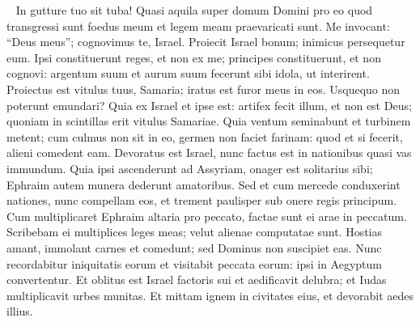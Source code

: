 \begin{biblechapter}   
\verse In gutture tuo sit tuba! Quasi aquila super domum Domini pro eo quod transgressi sunt foedus meum et legem meam praevaricati sunt. 
\verse Me invocant: “Deus meus”; cognovimus te, Israel. 
\verse Proiecit Israel bonum; inimicus persequetur eum. 
\verse Ipsi constituerunt reges, et non ex me; principes constituerunt, et non cognovi: argentum suum et aurum suum fecerunt sibi idola, ut interirent. 
\verse Proiectus est vitulus tuus, Samaria; iratus est furor meus in eos. Usquequo non poterunt emundari? 
\verse Quia ex Israel et ipse est: artifex fecit illum, et non est Deus; quoniam in scintillas erit vitulus Samariae. 
\verse Quia ventum seminabunt et turbinem metent; cum culmus non sit in eo, germen non faciet farinam: quod et si fecerit, alieni comedent eam. 
\verse Devoratus est Israel, nunc factus est in nationibus quasi vas immundum. 
\verse Quia ipsi ascenderunt ad Assyriam, onager est solitarius sibi; Ephraim autem munera dederunt amatoribus. 
\verse Sed et cum mercede conduxerint nationes, nunc compellam eos, et trement paulisper sub onere regis principum. 
\verse Cum multiplicaret Ephraim altaria pro peccato, factae sunt ei arae in peccatum. 
\verse Scribebam ei multiplices leges meas; velut alienae computatae sunt. 
\verse Hostias amant, immolant carnes et comedunt; sed Dominus non suscipiet eas. Nunc recordabitur iniquitatis eorum et visitabit peccata eorum: ipsi in Aegyptum convertentur. 
\verse Et oblitus est Israel factoris sui et aedificavit delubra; et Iudas multiplicavit urbes munitas. Et mittam ignem in civitates eius, et devorabit aedes illius. 
\end{biblechapter}


